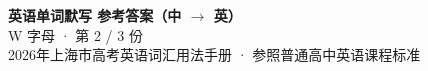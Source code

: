 \documentclass[10pt,a4paper]{article}
\begin{document}
\pagestyle{plain}

\begin{center}
{\LARGE\bfseries 英语单词默写 \quad 参考答案（中 $\to$ 英）}\\[0.22em]
{\large W 字母 · 第 2 / 3 份}\\[0.18em]
{\small 2026年上海市高考英语词汇用法手册 · 参照普通高中英语课程标准}
\end{center}

\vspace{0.2em}
\noindent{\color{rulegray}\rule{\textwidth}{0.8pt}}

\vspace{0.35em}

\vspace{0.25em}
\renewcommand{\arraystretch}{1.32}
\end{document}
